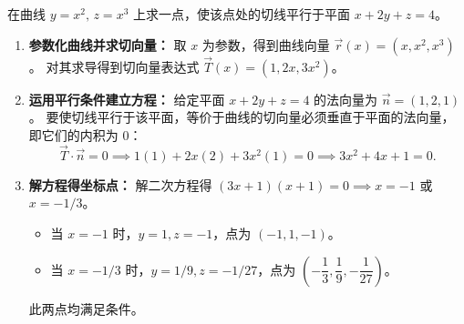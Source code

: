 \documentclass[lang=cn,11pt]{elegantbook}
\begin{document}
\begin{exercise}[寻找满足特定切线条件的点]
在曲线 $y=x^2,\,z=x^3$ 上求一点，使该点处的切线平行于平面 $x+2y+z=4$。
\end{exercise}
\begin{solution}
\begin{enumerate}
    \item \textbf{参数化曲线并求切向量：}
    取 $x$ 为参数，得到曲线向量 $\vec{r}(x) = (x, x^2, x^3)$。
    对其求导得到切向量表达式 $\vec{T}(x) = (1, 2x, 3x^2)$。

    \item \textbf{运用平行条件建立方程：}
    给定平面 $x+2y+z=4$ 的法向量为 $\vec{n} = (1, 2, 1)$。
    要使切线平行于该平面，等价于曲线的切向量必须垂直于平面的法向量，即它们的内积为 0：
    \[ \vec{T} \cdot \vec{n} = 0 \implies 1(1) + 2x(2) + 3x^2(1) = 0 \implies 3x^2 + 4x + 1 = 0. \]

    \item \textbf{解方程得坐标点：}
    解二次方程得 $(3x+1)(x+1) = 0 \implies x = -1$ 或 $x = -1/3$。
    \begin{itemize}
        \item 当 $x = -1$ 时，$y=1, z=-1$，点为 $(-1, 1, -1)$。
        \item 当 $x = -1/3$ 时，$y=1/9, z=-1/27$，点为 $\left(-\dfrac{1}{3}, \dfrac{1}{9}, -\dfrac{1}{27}\right)$。
    \end{itemize}
    此两点均满足条件。
\end{enumerate}
\end{solution}
\end{document}
